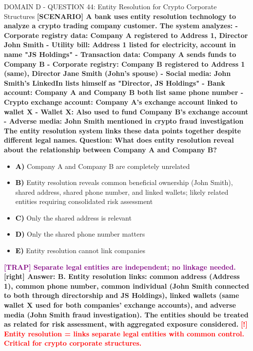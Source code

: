 \documentclass[11pt,a4paper]{beamer}
\newcommand{\redflag}[1]{\textcolor{red}{\textbf{[!] #1}}}
\newcommand{\trap}[1]{\textcolor{purple}{\textbf{[TRAP] #1}}}
\newcommand{\correct}[1]{\textcolor{green!50!black}{\textbf{[right] #1}}}
\newcommand{\scenario}[1]{\textcolor{blue!70!black}{\textbf{[SCENARIO] #1}}}
\newcommand{\option}[1]{\textcolor{black}{\textbf{#1}}}
\begin{document}
\begin{frame}{DOMAIN D - QUESTION 44: Entity Resolution for Crypto Corporate Structures}
\scenario{A bank uses entity resolution technology to analyze a crypto trading company customer. The system analyzes:
- Corporate registry data: Company A registered to Address 1, Director John Smith
- Utility bill: Address 1 listed for electricity, account in name "JS Holdings"
- Transaction data: Company A sends funds to Company B
- Corporate registry: Company B registered to Address 1 (same), Director Jane Smith (John's spouse)
- Social media: John Smith's LinkedIn lists himself as "Director, JS Holdings"
- Bank account: Company A and Company B both list same phone number
- Crypto exchange account: Company A's exchange account linked to wallet X
- Wallet X: Also used to fund Company B's exchange account
- Adverse media: John Smith mentioned in crypto fraud investigation
The entity resolution system links these data points together despite different legal names.}
\vspace{0.2cm}
\textbf{Question: What does entity resolution reveal about the relationship between Company A and Company B?}
\vspace{0.1cm}
\begin{itemize}
    \item \option{A)} Company A and Company B are completely unrelated
    \item \option{B)} Entity resolution reveals common beneficial ownership (John Smith), shared address, shared phone number, and linked wallets; likely related entities requiring consolidated risk assessment
    \item \option{C)} Only the shared address is relevant
    \item \option{D)} Only the shared phone number matters
    \item \option{E)} Entity resolution cannot link companies
\end{itemize}
\vspace{0.2cm}
\trap{Separate legal entities are independent; no linkage needed.}
\correct{Answer: B. Entity resolution links: common address (Address 1), common phone number, common individual (John Smith connected to both through directorship and JS Holdings), linked wallets (same wallet X used for both companies' exchange accounts), and adverse media (John Smith fraud investigation). The entities should be treated as related for risk assessment, with aggregated exposure considered.}
\redflag{Entity resolution = links separate legal entities with common control. Critical for crypto corporate structures.}
\end{frame}
\end{document}

